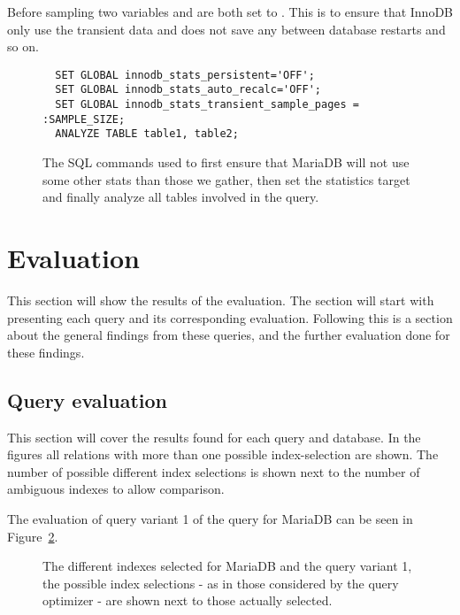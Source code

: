 Before sampling two variables  and
 are both set to . This is to ensure
that InnoDB only use the transient data and does not save any between database
restarts and so on.

\begin{figure}[ht]
\begin{verbatim}
  SET GLOBAL innodb_stats_persistent='OFF';
  SET GLOBAL innodb_stats_auto_recalc='OFF';
  SET GLOBAL innodb_stats_transient_sample_pages = :SAMPLE_SIZE;
  ANALYZE TABLE table1, table2;
\end{verbatim}
\caption[The SQL commands used to resample in MariaDB.]{The SQL commands used to
first ensure that MariaDB will not use some other stats than those we gather,
then set the statistics target and finally analyze all tables involved in the query.}
\label{fig:sql:resamplemdb}
\end{figure}

\section{Evaluation}
This section will show the results of the evaluation. The section will start
with presenting each query and its corresponding evaluation. Following this is a
section about the general findings from these queries, and the further
evaluation done for these findings.

\subsection{Query evaluation}
This section will cover the results found for each query and database. In the
figures all relations with more than one possible index-selection are shown.
The number of possible different index selections is shown next to the number of
ambiguous indexes to allow comparison.

The evaluation of query variant 1 of the query for MariaDB can be seen in
Figure~\ref{fig:plot:mariadb:query1}.

\begin{figure}
\caption[The index selections for MariaDB and query variant 1.]{The different
  indexes selected for MariaDB and the query variant 1, the possible index
  selections - as in those considered by the query optimizer - are shown next to
those actually selected.}
\label{fig:plot:mariadb:query1}
\end{figure}